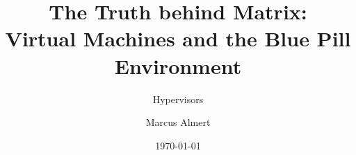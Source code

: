 \title[BluePill]{The Truth behind Matrix:\\ Virtual Machines and the Blue Pill Environment}
\subtitle{\Large{Hypervisors}}
\author[M. Almert]{Marcus Almert}

\date{\today}
\raggedright
\AtBeginSection{\frame{\sectionpage}}

